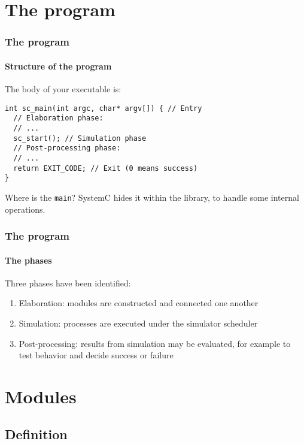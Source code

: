 \section{The program}

\begin{frame}[fragile]
\frametitle{The program}
\framesubtitle{Structure of the program}

\begin{block}{The body of your executable is:}
\vspace{-1em}
\begin{verbatim}
int sc_main(int argc, char* argv[]) { // Entry
  // Elaboration phase:
  // ...
  sc_start(); // Simulation phase
  // Post-processing phase:
  // ...
  return EXIT_CODE; // Exit (0 means success)
}
\end{verbatim}
\vspace{-1em}
\end{block}
\pause
\begin{block}{Where is the \texttt{main}?}
SystemC hides it within the library, to handle some internal operations.
\end{block}
\end{frame}

\begin{frame}
\frametitle{The program}
\framesubtitle{The phases}

\begin{block}{Three phases have been identified:}
\begin{enumerate}
\item Elaboration: modules are constructed and connected one another
\item Simulation: processes are executed under the simulator scheduler
\item Post-processing: results from simulation may be evaluated, for example to test behavior and decide success or failure
\end{enumerate}
\end{block}

\end{frame}

\section{Modules}

\subsection{Definition}


